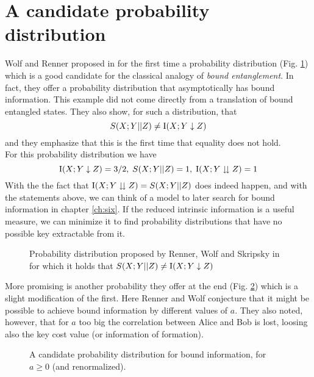 \section{A candidate probability distribution}\label{daproblem}
    Wolf and Renner proposed in \cite{RW03} for the first time a probability distribution (Fig. \ref{Tab:candidate}) which is a good candidate for the classical analogy of \emph{bound entanglement}. 
    In fact, they offer a probability distribution that asymptotically has bound information. 
    This example did not come directly from a translation of bound entangled states.
    They also show, for such a distribution, that 
    \begin{equation}
    	S(X;Y||Z) \neq \operatorname{I}(X;Y\downarrow Z)
    \end{equation}  
     and they emphasize that this is the first time that equality does not hold.\\
     For this probability distribution we have
	$$ \operatorname{I}(X;Y\downarrow Z) = 3/2 ,\; S(X;Y||Z) = 1 , \; \operatorname{I}(X;Y\downdownarrows Z) = 1 $$
	With the the fact that $\operatorname{I}(X;Y\downdownarrows Z) = S(X;Y||Z)$ does indeed happen, and with the statements above, we can think of a model to later search for bound information in chapter \ref{ch:six}. 
	If the reduced intrinsic information is a useful measure, we can minimize it to find probability distributions that have no possible key extractable from it.\\
     
	\begin{figure}
		
	    \caption{Probability distribution proposed by Renner, Wolf and Skripsky in \cite{RW03} for which it holds that $S(X;Y||Z) \neq \operatorname{I}(X;Y\downarrow Z)$}
	    \label{Tab:candidate}
	\end{figure}	 
	
	More promising is another probability they offer at the end (Fig. \ref{Tab:candidate2}) which is a slight modification of the first. 
	Here Renner and Wolf conjecture that it might be possible to achieve bound information by different values of $a$. 
	They also noted, however, that for $a$ too big the correlation between Alice and Bob is lost, loosing also the key cost value (or information of formation).
	
	
	\begin{figure}
		
	    	
	    	\caption{A candidate probability distribution for bound information, for $a\geq 0$ (and renormalized).}
	    	\label{Tab:candidate2}
	\end{figure}
    